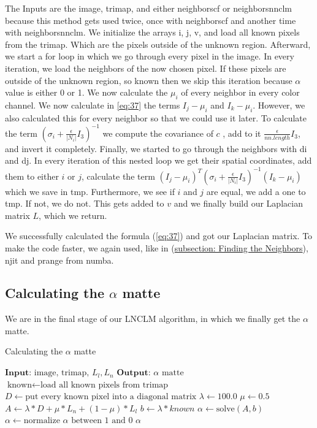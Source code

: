 The Inputs are the image, trimap, and either neighborscf or neighborsnnclm because this method gets used twice, once with neighborscf and another time with neighborsnnclm. We initialize the arrays i, j, v, and load all known pixels from the trimap. Which are the pixels outside of the unknown region. 
Afterward, we start a for loop in which we go through every pixel in the image. In every iteration, we load the neighbors of the now chosen pixel. If these pixels are outside of the unknown region, so known then we skip this iteration because \(\alpha\) value is either 0 or 1. We now calculate the \(\mu_i\) of every neighbor in every color channel. We now calculate in \ref{eq:37} the terms \(I_j - \mu_i\) and \(I_k - \mu_i\). However, we also calculated this for every neighbor so that we could use it later. To calculate the term \((\sigma_i + \frac{\epsilon}{|N_i|} I_3)^{-1}\) we compute the covariance of \(c\) , add to it \(\frac{\epsilon}{nn.length} I_3\), and invert it completely. 
Finally, we started to go through the neighbors with di and dj. In every iteration of this nested loop we get their spatial coordinates, add them to either \(i\) or \(j\), calculate the term \((I_j - \mu_i)^T (\sigma_i + \frac{\epsilon}{|N_i|} I_3)^{-1}(I_k - \mu_i)\) which we save in tmp. Furthermore, we see if \(i\) and \(j\) are equal, we add a one to tmp. If not, we do not. This gets added to \(v\) and we finally build our Laplacian matrix \(L\), which we return.

We successfully calculated the formula (\ref{eq:37}) and got our Laplacian matrix. To make the code faster, we again used, like in (\hyperref[subsec:neigh]{subsection: Finding the Neighbors}), njit and prange from numba.

\subsection{Calculating the $\alpha$ matte}
We are in the final stage of our LNCLM algorithm, in which we finally get the \(\alpha\) matte. 


\begin{algorithm}[t]
	\caption{Calculating the \( \alpha \) matte}\label{alpha}
	\begin{algorithmic}[1]
		\State $\textbf{Input: }  \text{image, trimap, }L_l, L_n $
		\State $\textbf{Output: }  \alpha \text{ matte}$
		\State $\text{known} \gets \text{load all known pixels from trimap}$
		\State $D \gets \text{put every known pixel into a diagonal matrix}$
		\newline
		\State $\lambda \gets 100.0$
		\State $\mu \gets 0.5$
		\newline
		\State $A \gets \lambda * D + \mu * L_n + (1 - \mu) * L_l$
		\newline
		\State $b \gets \lambda * known $
		\newline
		\State $\alpha \gets \text{solve}(A, b)$
		\State $\alpha \gets \text{normalize \(\alpha\) between 1 and 0}$
		\newline
		\Return $\alpha$
	\end{algorithmic}
\end{algorithm}


